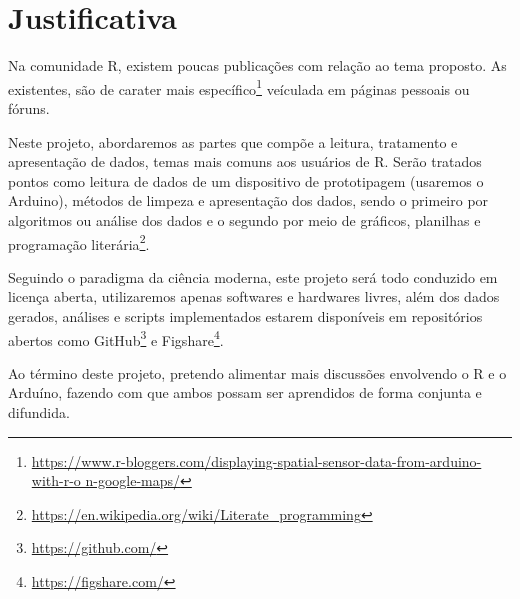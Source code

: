 \chapter*[Justificativa]{Justificativa}

Na comunidade R, existem poucas publicações com relação ao tema proposto. As existentes, são de carater mais 
específico\footnote{\url{https://www.r-bloggers.com/displaying-spatial-sensor-data-from-arduino-with-r-o
n-google-maps/}} veículada em páginas pessoais ou fóruns. 

Neste projeto, abordaremos as partes que compõe a leitura, tratamento e 
apresentação de dados, temas mais comuns aos usuários de R. Serão tratados 
pontos como leitura de dados de um dispositivo de prototipagem (usaremos o 
Arduino), métodos de limpeza e apresentação dos dados, sendo o primeiro por 
algoritmos ou análise dos dados e o segundo por meio de gráficos, planilhas e 
programação literária\footnote{\url{https://en.wikipedia.org/wiki/Literate_programming}}.

Seguindo o paradigma da ciência moderna, este projeto será todo conduzido em 
licença aberta, utilizaremos apenas softwares e hardwares livres, além dos dados 
gerados, análises e scripts implementados estarem disponíveis em repositórios 
abertos como GitHub\footnote{\url{https://github.com/}} e Figshare\footnote{\url{https://figshare.com/}}.

Ao término deste projeto, pretendo alimentar mais discussões envolvendo o R e o 
Arduíno, fazendo com que ambos possam ser aprendidos de forma conjunta e 
difundida. 

